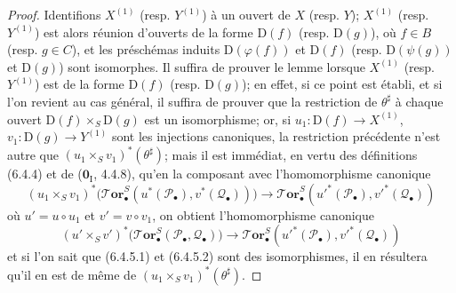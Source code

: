 \begin{proof}
Identifions $X^{(1)}$ (resp. $Y^{(1)}$) à un ouvert de $X$ (resp. $Y$);
$X^{(1)}$ (resp. $Y^{(1)}$) est alors réunion d'ouverts de la forme
$\mathrm D(f)$ (resp. $\mathrm D(g)$), où $f\in B$ (resp. $g\in C$), et les
préschémas induits $\mathrm D(\varphi(f))$ et $\mathrm D(f)$ (resp.
$\mathrm D(\psi(g))$ et $\mathrm D(g)$) sont isomorphes. Il suffira de prouver
le lemme lorsque $X^{(1)}$ (resp. $Y^{(1)}$) est de la forme $\mathrm D(f)$
(resp. $\mathrm D(g)$); en effet, si ce point est établi, et si l'on revient au
cas général, il suffira de prouver que la restriction de $\theta^\sharp$ à
chaque ouvert $\mathrm D(f)\times_S\mathrm D(g)$ est un isomorphisme; or, si
$u_1:\mathrm D(f)\to X^{(1)}$, $v_1:\mathrm D(g)\to Y^{(1)}$ sont les
injections canoniques, la restriction précédente n'est autre que
$(u_1\times_S v_1)^*(\theta^\sharp)$; mais il est immédiat, en vertu des
définitions (6.4.4) et de ($\mathbf{0}_{\mathrm I}$, 4.4.8), qu'en la composant avec
l'homomorphisme canonique
\[
  (u_1\times_S v_1)^*
  \bigl(\boldsymbol{\mathscr{T}\!or}_\bullet^S
    (u^*(\mathscr P_\bullet),v^*(\mathscr Q_\bullet))\bigr)
  \longrightarrow
  \boldsymbol{\mathscr{T}\!or}_\bullet^S
  (u'^*(\mathscr P_\bullet),v'^*(\mathscr Q_\bullet))
  \tag{6.4.5.1}\label{III.6.4.5.1.fr}
\]
où $u'=u\circ u_1$ et $v'=v\circ v_1$, on obtient l'homomorphisme canonique
\[
  (u'\times_S v')^*
  \bigl(\boldsymbol{\mathscr{T}\!or}_\bullet^S(\mathscr P_\bullet,\mathscr Q_\bullet)\bigr)
  \longrightarrow
  \boldsymbol{\mathscr{T}\!or}_\bullet^S
  (u'^*(\mathscr P_\bullet),v'^*(\mathscr Q_\bullet))
  \tag{6.4.5.2}\label{III.6.4.5.2.fr}
\]
et si l'on sait que (6.4.5.1) et (6.4.5.2) sont des isomorphismes, il en
résultera qu'il en est de même de $(u_1\times_S v_1)^*(\theta^\sharp)$.


\end{proof}
